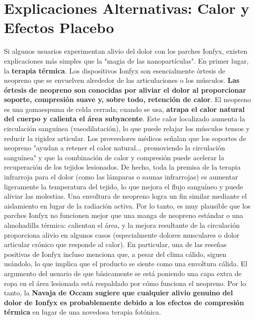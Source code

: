 \documentclass{article}
\begin{document}
\section{Explicaciones Alternativas: Calor y Efectos Placebo}

Si algunos usuarios experimentan alivio del dolor con los parches Ionfyx, existen explicaciones más simples que la "magia de las nanopartículas". En primer lugar, la \textbf{terapia térmica}. Los dispositivos Ionfyx son esencialmente órtesis de neopreno que se envuelven alrededor de las articulaciones o los músculos. \textbf{Las órtesis de neopreno son conocidas por aliviar el dolor al proporcionar soporte, compresión suave y, sobre todo, retención de calor}. El neopreno es una gomaespuma de celda cerrada; cuando se usa, \textbf{atrapa el calor natural del cuerpo y calienta el área subyacente}. Este calor localizado aumenta la circulación sanguínea (vasodilatación), lo que puede relajar los músculos tensos y reducir la rigidez articular. Los proveedores médicos señalan que los soportes de neopreno "ayudan a retener el calor natural... promoviendo la circulación sanguínea" y que la combinación de calor y compresión puede acelerar la recuperación de los tejidos lesionados. De hecho, toda la premisa de la terapia infrarroja para el dolor (como las lámparas o saunas infrarrojas) es aumentar ligeramente la temperatura del tejido, lo que mejora el flujo sanguíneo y puede aliviar las molestias. Una envoltura de neopreno logra un fin similar mediante el aislamiento en lugar de la radiación activa. Por lo tanto, es muy plausible que los parches Ionfyx no funcionen mejor que una manga de neopreno estándar o una almohadilla térmica: calientan el área, y la mejora resultante de la circulación proporciona alivio en algunos casos (especialmente dolores musculares o dolor articular crónico que responde al calor). En particular, una de las reseñas positivas de Ionfyx incluso menciona que, a pesar del clima cálido, siguen usándolo, lo que implica que el producto se siente como una envoltura cálida. El argumento del usuario de que básicamente se está poniendo una capa extra de ropa en el área lesionada está respaldado por cómo funciona el neopreno. Por lo tanto, la \textbf{Navaja de Occam sugiere que cualquier alivio genuino del dolor de Ionfyx es probablemente debido a los efectos de compresión térmica} en lugar de una novedosa terapia fotónica.
\end{document}
